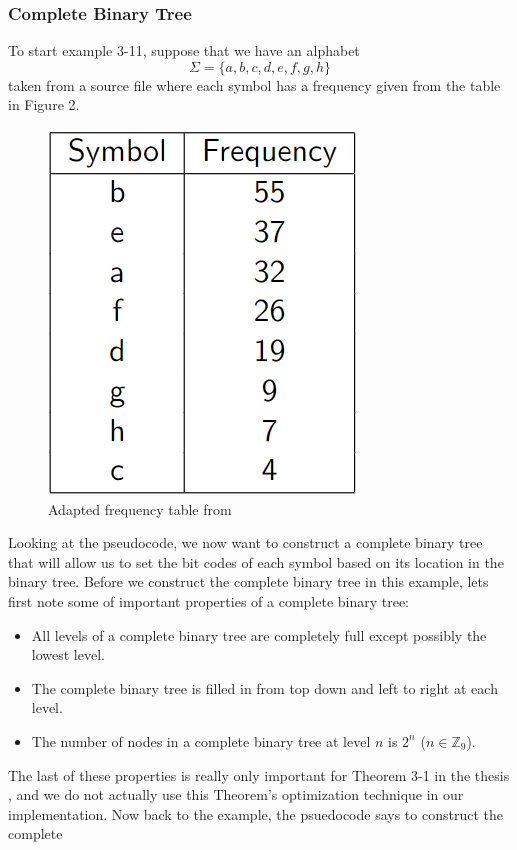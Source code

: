 \documentclass[12pt]{IEEEtran}
\begin{document}
\subsubsection{Complete Binary Tree} 
To start example 3-11, suppose that we have an alphabet 
\[\Sigma = \{a,b,c,d,e,f,g,h\}\]
taken from a source file where each symbol has a frequency
given from the table in Figure 2.
\begin{figure}
\centering
\includegraphics[scale=0.4]{../presentation/images/freqtbl.PNG}
\caption{Adapted frequency table from \cite{Sjostrand}}
\end{figure}
Looking at the pseudocode, we now want to construct a complete binary tree that will allow us to set the bit codes of each
symbol based on its location in the binary tree. Before we construct the complete binary tree in this example, lets first note some of
important properties of a complete binary tree:
\begin{itemize}
\item All levels of a complete binary tree are completely full except possibly the lowest level.
\item The complete binary tree is filled in from top down and left to right at each level.
\item The number of nodes in a complete binary tree at level $n$ is $2^n$ ($n \in \mathbb{Z}_9$).
\end{itemize}
The last of these properties is really only important for Theorem 3-1 in the thesis \cite{Sjostrand}, and we do not actually use
this Theorem's optimization technique in our implementation. Now back to the example, the psuedocode says to construct the complete
\end{document}
